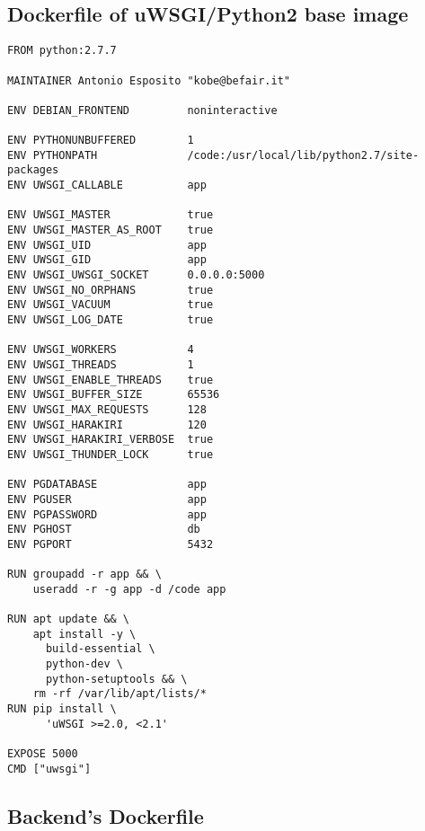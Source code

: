 \subsection{Dockerfile of uWSGI/Python2 base
image}\label{dockerfile-of-uwsgipython2-base-image}

\begin{verbatim}
FROM python:2.7.7

MAINTAINER Antonio Esposito "kobe@befair.it"

ENV DEBIAN_FRONTEND         noninteractive

ENV PYTHONUNBUFFERED        1
ENV PYTHONPATH              /code:/usr/local/lib/python2.7/site-packages
ENV UWSGI_CALLABLE          app

ENV UWSGI_MASTER            true
ENV UWSGI_MASTER_AS_ROOT    true
ENV UWSGI_UID               app
ENV UWSGI_GID               app
ENV UWSGI_UWSGI_SOCKET      0.0.0.0:5000
ENV UWSGI_NO_ORPHANS        true
ENV UWSGI_VACUUM            true
ENV UWSGI_LOG_DATE          true

ENV UWSGI_WORKERS           4
ENV UWSGI_THREADS           1
ENV UWSGI_ENABLE_THREADS    true
ENV UWSGI_BUFFER_SIZE       65536
ENV UWSGI_MAX_REQUESTS      128
ENV UWSGI_HARAKIRI          120
ENV UWSGI_HARAKIRI_VERBOSE  true
ENV UWSGI_THUNDER_LOCK      true

ENV PGDATABASE              app
ENV PGUSER                  app
ENV PGPASSWORD              app
ENV PGHOST                  db
ENV PGPORT                  5432

RUN groupadd -r app && \
    useradd -r -g app -d /code app

RUN apt update && \
    apt install -y \
      build-essential \
      python-dev \
      python-setuptools && \
    rm -rf /var/lib/apt/lists/*
RUN pip install \
      'uWSGI >=2.0, <2.1'

EXPOSE 5000
CMD ["uwsgi"]
\end{verbatim}

\subsection{Backend's Dockerfile}\label{backends-dockerfile}

